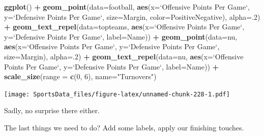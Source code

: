 \documentclass[
]{book}
\newenvironment{Shaded}{\begin{snugshade}}{\end{snugshade}}
\newcommand{\DataTypeTok}[1]{\textcolor[rgb]{0.13,0.29,0.53}{#1}}
\newcommand{\DecValTok}[1]{\textcolor[rgb]{0.00,0.00,0.81}{#1}}
\newcommand{\KeywordTok}[1]{\textcolor[rgb]{0.13,0.29,0.53}{\textbf{#1}}}
\newcommand{\NormalTok}[1]{#1}
\newcommand{\OperatorTok}[1]{\textcolor[rgb]{0.81,0.36,0.00}{\textbf{#1}}}
\newcommand{\StringTok}[1]{\textcolor[rgb]{0.31,0.60,0.02}{#1}}
\begin{document}
\begin{Shaded}
\begin{Highlighting}[]
\KeywordTok{ggplot}\NormalTok{() }\OperatorTok{+}
\StringTok{  }\KeywordTok{geom_point}\NormalTok{(}\DataTypeTok{data=}\NormalTok{football, }\KeywordTok{aes}\NormalTok{(}\DataTypeTok{x=}\StringTok{`}\DataTypeTok{Offensive Points Per Game}\StringTok{`}\NormalTok{, }\DataTypeTok{y=}\StringTok{`}\DataTypeTok{Defensive Points Per Game}\StringTok{`}\NormalTok{, }\DataTypeTok{size=}\NormalTok{Margin, }\DataTypeTok{color=}\NormalTok{PositiveNegative), }\DataTypeTok{alpha=}\NormalTok{.}\DecValTok{2}\NormalTok{) }\OperatorTok{+}
\StringTok{  }\KeywordTok{geom_text_repel}\NormalTok{(}\DataTypeTok{data=}\NormalTok{topteams, }\KeywordTok{aes}\NormalTok{(}\DataTypeTok{x=}\StringTok{`}\DataTypeTok{Offensive Points Per Game}\StringTok{`}\NormalTok{, }\DataTypeTok{y=}\StringTok{`}\DataTypeTok{Defensive Points Per Game}\StringTok{`}\NormalTok{, }\DataTypeTok{label=}\NormalTok{Name)) }\OperatorTok{+}\StringTok{ }
\StringTok{  }\KeywordTok{geom_point}\NormalTok{(}\DataTypeTok{data=}\NormalTok{nu, }\KeywordTok{aes}\NormalTok{(}\DataTypeTok{x=}\StringTok{`}\DataTypeTok{Offensive Points Per Game}\StringTok{`}\NormalTok{, }\DataTypeTok{y=}\StringTok{`}\DataTypeTok{Defensive Points Per Game}\StringTok{`}\NormalTok{, }\DataTypeTok{size=}\NormalTok{Margin), }\DataTypeTok{alpha=}\NormalTok{.}\DecValTok{2}\NormalTok{) }\OperatorTok{+}
\StringTok{  }\KeywordTok{geom_text_repel}\NormalTok{(}\DataTypeTok{data=}\NormalTok{nu, }\KeywordTok{aes}\NormalTok{(}\DataTypeTok{x=}\StringTok{`}\DataTypeTok{Offensive Points Per Game}\StringTok{`}\NormalTok{, }\DataTypeTok{y=}\StringTok{`}\DataTypeTok{Defensive Points Per Game}\StringTok{`}\NormalTok{, }\DataTypeTok{label=}\NormalTok{Name)) }\OperatorTok{+}\StringTok{ }
\StringTok{  }\KeywordTok{scale_size}\NormalTok{(}\DataTypeTok{range =} \KeywordTok{c}\NormalTok{(}\DecValTok{0}\NormalTok{, }\DecValTok{6}\NormalTok{), }\DataTypeTok{name=}\StringTok{"Turnovers"}\NormalTok{)}
\end{Highlighting}
\end{Shaded}

\texttt{[image: SportsData\_files/figure-latex/unnamed-chunk-228-1.pdf]}

Sadly, no surprise there either.

The last things we need to do? Add some labels, apply our finishing touches.
\end{document}
